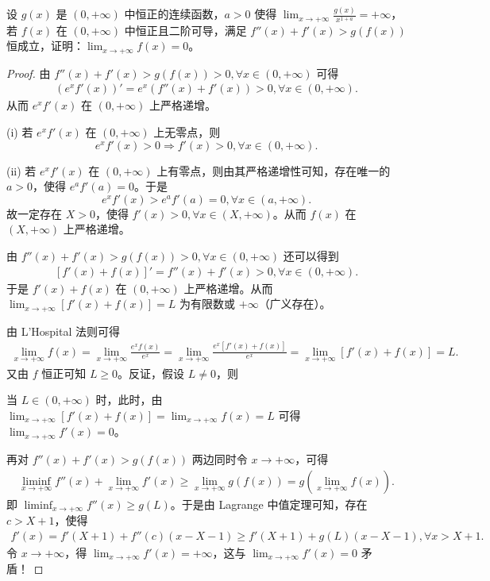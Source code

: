 \documentclass[../../main.tex]{subfiles}%
\begin{document}
\vspace{0.5cm}

\begin{example}
设 \( g(x) \) 是 \( (0,+\infty) \) 中恒正的连续函数，\( a>0 \) 使得 \( \lim_{x \to +\infty} \frac{g(x)}{x^{1 + a}} = +\infty \)，若 \( f(x) \) 在 \( (0,+\infty) \) 中恒正且二阶可导，满足 \( f''(x) + f'(x) > g(f(x)) \) 恒成立，证明：\( \lim_{x \to +\infty} f(x) = 0 \)。
\end{example}
\begin{proof}
由 \( f''(x) + f'(x) > g(f(x)) > 0, \forall x \in (0,+\infty) \) 可得
\begin{align*}
\left( e^x f'(x) \right)' = e^x \left( f''(x) + f'(x) \right) > 0, \forall x \in (0,+\infty).
\end{align*}
从而 \( e^x f'(x) \) 在 \( (0,+\infty) \) 上严格递增。

(i) 若 \( e^x f'(x) \) 在 \( (0,+\infty) \) 上无零点，则
\[
e^x f'(x) > 0 \Rightarrow f'(x) > 0, \forall x \in (0,+\infty).
\]

(ii) 若 \( e^x f'(x) \) 在 \( (0,+\infty) \) 上有零点，则由其严格递增性可知，存在唯一的 \( a > 0 \)，使得 \( e^a f'(a) = 0 \)。于是
\[
e^x f'(x) > e^a f'(a) = 0, \forall x \in (a,+\infty).
\]
故一定存在 \( X > 0 \)，使得 \( f'(x) > 0, \forall x \in (X,+\infty) \)。从而 \( f(x) \) 在 \( (X,+\infty) \) 上严格递增。

由 \( f''(x) + f'(x) > g(f(x)) > 0, \forall x \in (0,+\infty) \) 还可以得到
\begin{align*}
\left[ f'(x) + f(x) \right]' = f''(x) + f'(x) > 0, \forall x \in (0,+\infty).
\end{align*}
于是 \( f'(x) + f(x) \) 在 \( (0,+\infty) \) 上严格递增。从而 \( \lim_{x \to +\infty} \left[ f'(x) + f(x) \right] = L \) 为有限数或 \( +\infty \)（广义存在）。

由 L'Hospital 法则可得
\begin{align*}
\lim_{x \to +\infty} f(x) = \lim_{x \to +\infty} \frac{e^x f(x)}{e^x} = \lim_{x \to +\infty} \frac{e^x \left[ f'(x) + f(x) \right]}{e^x} = \lim_{x \to +\infty} \left[ f'(x) + f(x) \right] = L.
\end{align*}
又由 \( f \) 恒正可知 \( L \geqslant  0 \)。反证，假设 \( L \neq 0 \)，则

\one 当 \( L \in (0,+\infty) \) 时，此时，由 \( \lim_{x \to +\infty} \left[ f'(x) + f(x) \right] = \lim_{x \to +\infty} f(x) = L \) 可得 \( \lim_{x \to +\infty} f'(x) = 0 \)。

再对 \( f''(x) + f'(x) > g(f(x)) \) 两边同时令 \( x \to +\infty \)，可得
\begin{align*}
\liminf_{x \to +\infty} f''(x) + \lim_{x \to +\infty} f'(x) \geqslant  \lim_{x \to +\infty} g(f(x)) = g\left( \lim_{x \to +\infty} f(x) \right).
\end{align*}
即 \( \liminf_{x \to +\infty} f''(x) \geqslant  g(L) \)。于是由 Lagrange 中值定理可知，存在 \( c > X + 1 \)，使得
\begin{align*}
f'(x) = f'(X + 1) + f''(c) (x - X - 1) \geqslant  f'(X + 1) + g(L) (x - X - 1), \forall x > X + 1.
\end{align*}
令 \( x \to +\infty \)，得 \( \lim_{x \to +\infty} f'(x) = +\infty \)，这与 \( \lim_{x \to +\infty} f'(x) = 0 \) 矛盾！


\end{proof}
\end{document}
